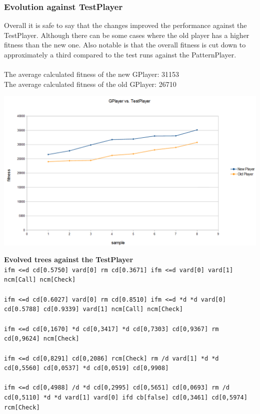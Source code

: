 \documentclass[12pt,fleqn,a4paper]{article}
\begin{document}
\subsubsection{Evolution against TestPlayer}
Overall it is safe to say that the changes improved the performance against the TestPlayer. Although there can be some cases where the old player has a higher fitness than the new one. Also notable is that the overall fitness is cut down to approximately a third compared to the test runs against the PatternPlayer. \\ \\
The average calculated fitness of the new GPlayer: 31153\\
The average calculated fitness of the old GPlayer: 26710

\begin{center}
	\includegraphics[width=.9\textwidth]{gp_vs_tp_1.png}
\end{center}

\textbf{Evolved trees against the TestPlayer}\\
\texttt{ifm <=d cd[0.5750] vard[0] rm cd[0.3671] ifm <=d vard[0] vard[1] ncm[Call] ncm[Check]} \\ \\
\texttt{ifm <=d cd[0.6027] vard[0] rm cd[0.8510] ifm <=d *d *d vard[0] cd[0.5788] cd[0.9339] vard[1] ncm[Call] ncm[Check]}\\ \\
\texttt{ifm <=d cd[0,1670] *d cd[0,3417] *d cd[0,7303] cd[0,9367] rm cd[0,9624] ncm[Check]}\\ \\
\texttt{ifm <=d cd[0,8291] cd[0,2086] rcm[Check] rm /d vard[1] *d *d cd[0,5560] cd[0,0537] *d cd[0,0519] cd[0,9908]}\\ \\
\texttt{ifm <=d cd[0,4988] /d *d cd[0,2995] cd[0,5651] cd[0,0693] rm /d cd[0,5110] *d *d vard[1] vard[0] ifd cb[false] cd[0,3461] cd[0,5974] rcm[Check]}
\end{document}
